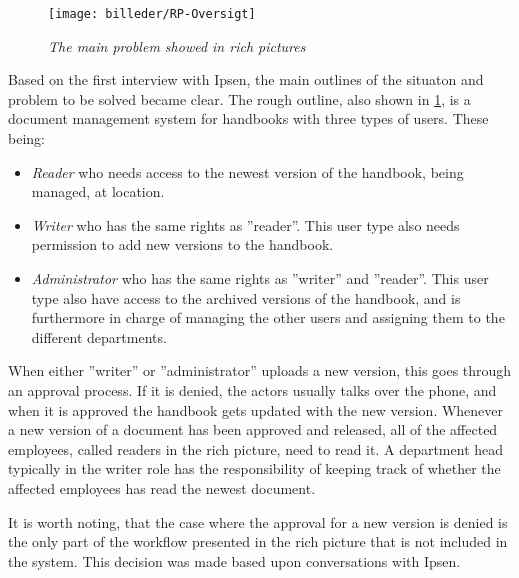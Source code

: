 \begin{figure}[H]
	\centering
	\texttt{[image: billeder/RP-Oversigt]}
	\caption{\textit{The main problem showed in rich pictures
	}}
	\label{fig:RP-Oversigt}
\end{figure}

Based on the first interview with Ipsen, the main outlines of the situaton and problem to be solved became clear.
The rough outline, also shown in \cref{fig:RP-Oversigt}, is a document management system for handbooks with three types of users. These being:
\begin{itemize}
	\item
		\textit{Reader} who needs access to the newest version of the handbook, being managed, at location.
	\item
		\textit{Writer} who has the same rights as ''reader''.
		This user type also needs permission to add new versions to the handbook.
	\item
		\textit{Administrator} who has the same rights as ''writer'' and ''reader''.
		This user type also have access to the archived versions of the handbook, and is furthermore in charge of managing the other users and assigning them to the different departments.
\end{itemize}
When either ''writer'' or ''administrator'' uploads a new version, this goes through an approval process.
If it is denied, the actors usually talks over the phone, and when it is approved the handbook gets updated with the new version.
Whenever a new version of a document has been approved and released, all of the affected employees, called readers in the rich picture, need to read it.
A department head typically in the writer role has the responsibility of keeping track of whether the affected employees has read the newest document.

It is worth noting, that the case where the approval for a new version is denied is the only part of the workflow presented in the rich picture that is not included in the system.
This decision was made based upon conversations with Ipsen.

